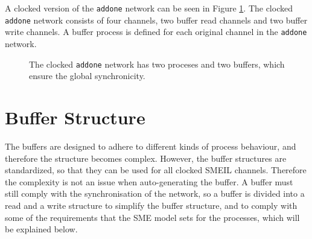 A clocked version of the \texttt{addone} network can be seen in Figure \ref{fig:addone_clocked}. The clocked \texttt{addone} network consists of four channels, two buffer read channels and two buffer write channels. A buffer process is defined for each original channel in the \texttt{addone} network. \\

\begin{figure}
\centering
{}
\caption{The clocked \texttt{addone} network has two proceses and two buffers, which ensure the global synchronicity.}
\label{fig:addone_clocked}
\end{figure}
\section{Buffer Structure}
The buffers are designed to adhere to different kinds of process behaviour, and therefore the structure becomes complex. However, the buffer structures are standardized, so that they can be used for all clocked SMEIL channels. Therefore the complexity is not an issue when auto-generating the buffer. A buffer must still comply with the synchronisation of the network, so a buffer is divided into a read and a write structure to simplify the buffer structure, and to comply with some of the requirements that the SME model sets for the processes, which will be explained below. \\

